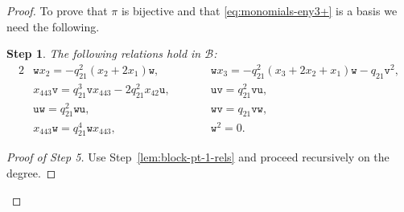 \documentclass[10pt,a4paper]{amsart}
\numberwithin{equation}{section}
\newtheorem{step}{Step}
\newcommand{\toba}{\mathscr B}
\newcommand{\ut}{\mathtt{u}}
\newcommand{\vt}{\mathtt{v}}
\newcommand{\wt}{\mathtt{w}}
\begin{document}
\begin{proof}
To prove that $\pi$ is bijective and that \eqref{eq:monomials-eny3+} is a basis we need the following.

\begin{step}\label{lem:block3-pt-1-relations-2}
The following relations hold in $\toba$:
\begin{alignat*}{2}
&\wt x_2 = -q_{21}^2(x_2+2x_1)\wt, &&\wt x_3 = -q_{21}^2(x_3+2x_2+x_1)\wt-q_{21}\vt^2,
\\
&x_{443}\vt = q_{21}^3\vt x_{443}-2q_{21}^2x_{42}\ut,\qquad &&\ut\vt = q_{21}^2\vt\ut,
\\
&\ut \wt = q_{21}^2 \wt \ut, &&\wt \vt = q_{21} \vt \wt,
\\
&x_{443} \wt = q_{21}^4 \wt x_{443}, &&\wt^2=0.
\end{alignat*}
\end{step}

\begin{proof}[Proof of Step 5]
Use Step~\ref{lem:block-pt-1-rels} and proceed recursively on the degree.
\end{proof}


\end{proof}
\end{document}
